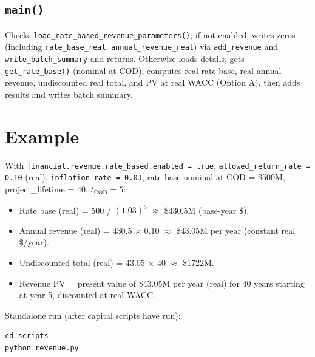 \documentclass[ctcc_full_documentation.tex]{subfiles}
\begin{document}
\subsection{\texttt{main()}}

Checks \texttt{load\_rate\_based\_revenue\_parameters()}; if not enabled, writes zeros (including \texttt{rate\_base\_real}, \texttt{annual\_revenue\_real}) via \texttt{add\_revenue} and \texttt{write\_batch\_summary} and returns. Otherwise loads details, gets \texttt{get\_rate\_base()} (nominal at COD), computes real rate base, real annual revenue, undiscounted real total, and PV at real WACC (Option A), then adds results and writes batch summary.

\section{Example}

With \texttt{financial.revenue.rate\_based.enabled = true}, \texttt{allowed\_return\_rate = 0.10} (real), \texttt{inflation\_rate = 0.03}, rate base nominal at COD = \$500M, project\_lifetime = 40, $t_{\mathrm{COD}} = 5$:
\begin{itemize}
    \item Rate base (real) = 500 / $(1.03)^5$ $\approx$ \$430.5M (base-year \$).
    \item Annual revenue (real) = 430.5 $\times$ 0.10 $\approx$ \$43.05M per year (constant real \$/year).
    \item Undiscounted total (real) = 43.05 $\times$ 40 $\approx$ \$1722M.
    \item Revenue PV = present value of \$43.05M per year (real) for 40 years starting at year 5, discounted at real WACC.
\end{itemize}

Standalone run (after capital scripts have run):
\begin{lstlisting}
cd scripts
python revenue.py
\end{lstlisting}
\end{document}
